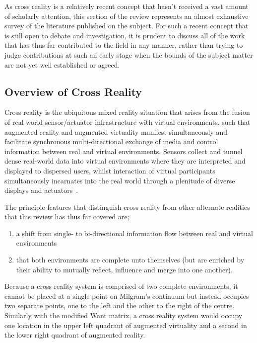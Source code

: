 As cross reality is a relatively recent concept that hasn't received a vast amount of scholarly attention, this section of the review represents an almost exhaustive survey of the literature published on the subject. For such a recent concept that is still open to debate and investigation, it is prudent to discuss all of the work that has thus far contributed to the field in any manner, rather than trying to judge contributions at such an early stage when the bounds of the subject matter are not yet well established or agreed.

\subsection{Overview of Cross Reality}
Cross reality is the ubiquitous mixed reality situation that arises from the fusion of real-world sensor/actuator infrastructure with virtual environments, such that augmented reality and augmented virtuality manifest simultaneously and facilitate synchronous multi-directional exchange of media and control information between real and virtual environments. Sensors collect and tunnel dense real-world data into virtual environments where they are interpreted and displayed to dispersed users, whilst interaction of virtual participants simultaneously incarnates into the real world through a plenitude of diverse displays and actuators~\cite{Paradiso2009}.

The principle features that distinguish cross reality from other alternate realities that this review has thus far covered are;
\begin{enumerate}
	\item a shift from single- to bi-directional information flow between real and virtual environments~\cite{kim:practical}
	\item that both environments are complete unto themselves (but are enriched by their ability to mutually reflect, influence and merge into one another).~\cite{lifton:merging}
\end{enumerate}

Because a cross reality system is comprised of two complete environments, it cannot be placed at a single point on Milgram's continuum but instead occupies two separate points, one to the left and the other to the right of the centre. Similarly with the modified Want matrix, a cross reality system would occupy one location in the upper left quadrant of augmented virtuality and a second in the lower right quadrant of augmented reality. 

